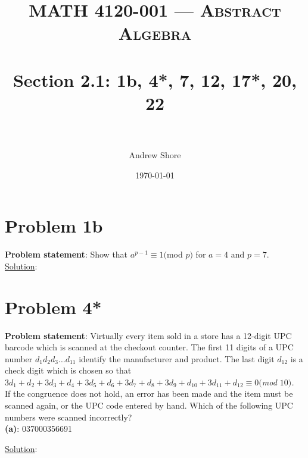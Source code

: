 \documentclass{article} %
\title{ 
\normalfont \normalsize 
\textsc{MATH 4120-001 --- Abstract Algebra} \\
\horrule{0.5pt} \\[0cm] %
\huge Section 2.1: 1b, 4*, 7, 12, 17*, 20, 22  \\ %
\horrule{2pt} \\[0cm] %
}
\author{Andrew Shore} %
\date{\normalsize\today} %
\begin{document}
\maketitle %

\section*{Problem 1b}


\textbf{Problem statement}: Show that $a^{p-1} \equiv 1 ($mod $p)$ for $a = 4$ and $p = 7$.
\\

\underline{Solution}: 
\begin{addmargin}[1em]{0em}

\end{addmargin}    

\newpage

\section*{Problem 4*}

\textbf{Problem statement}: Virtually every item sold in a store has a 12-digit UPC barcode which is scanned at the checkout counter.  The first 11 digits of a UPC number $d_1d_2d_3 \ldots d_{11}$ identify the manufacturer and product.  The last digit $d_{12}$ is a check digit which is chosen so that 
\\ \hfill \break
\textit{$3d_1 + d_2 + 3d_3 + d_4 + 3d_5 + d_6 + 3d_7 + d_8 + 3d_9 + d_{10} + 3d_{11} + d_{12} \equiv 0 ($mod $ 10)$.}
\\ \hfill \break
If the congruence does not hold, an error has been made and the item must be scanned again, or the UPC code entered by hand.  Which of the following UPC numbers were scanned incorrectly?
\\

\textbf{(a)}: 037000356691
\\
\begin{addmargin}[1em]{0em}
\underline{Solution}: 
\begin{addmargin}[1em]{0em}

\end{addmargin}
\begin{addmargin}[1em]{0em}
\end{addmargin}
\end{addmargin}
\end{document}

